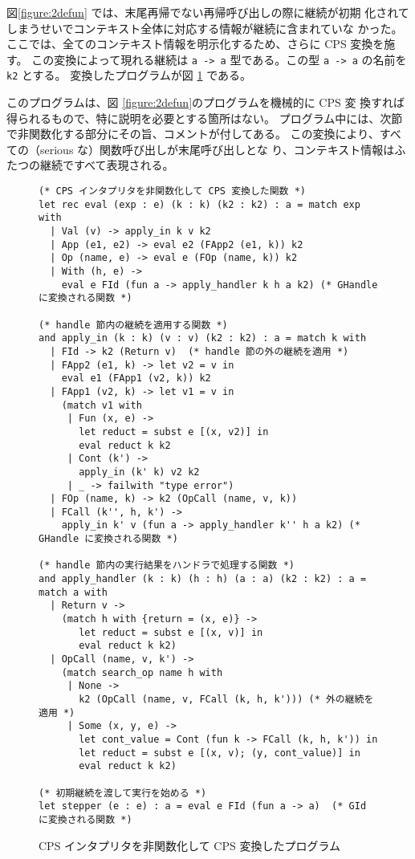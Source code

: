 図\ref{figure:2defun} では、末尾再帰でない再帰呼び出しの際に継続が初期
化されてしまうせいでコンテキスト全体に対応する情報が継続に含まれていな
かった。
ここでは、全てのコンテキスト情報を明示化するため、さらに CPS 変換を施
す。
この変換によって現れる継続は \texttt{a -> a} 型である。この型
\texttt{a -> a} の名前を \texttt{k2} とする。
変換したプログラムが図 \ref{figure:3cps} である。

このプログラムは、図 \ref{figure:2defun}のプログラムを機械的に CPS 変
換すれば得られるもので、特に説明を必要とする箇所はない。
プログラム中には、次節で非関数化する部分にその旨、コメントが付してある。
この変換により、すべての（serious な）関数呼び出しが末尾呼び出しとな
り、コンテキスト情報はふたつの継続ですべて表現される。

\begin{figure}
\begin{verbatim}
(* CPS インタプリタを非関数化して CPS 変換した関数 *)
let rec eval (exp : e) (k : k) (k2 : k2) : a = match exp with
  | Val (v) -> apply_in k v k2
  | App (e1, e2) -> eval e2 (FApp2 (e1, k)) k2
  | Op (name, e) -> eval e (FOp (name, k)) k2
  | With (h, e) ->
    eval e FId (fun a -> apply_handler k h a k2) (* GHandle に変換される関数 *)

(* handle 節内の継続を適用する関数 *)
and apply_in (k : k) (v : v) (k2 : k2) : a = match k with
  | FId -> k2 (Return v)  (* handle 節の外の継続を適用 *)
  | FApp2 (e1, k) -> let v2 = v in
    eval e1 (FApp1 (v2, k)) k2
  | FApp1 (v2, k) -> let v1 = v in
    (match v1 with
     | Fun (x, e) ->
       let reduct = subst e [(x, v2)] in
       eval reduct k k2
     | Cont (k') ->
       apply_in (k' k) v2 k2
     | _ -> failwith "type error")
  | FOp (name, k) -> k2 (OpCall (name, v, k))
  | FCall (k'', h, k') ->
    apply_in k' v (fun a -> apply_handler k'' h a k2) (* GHandle に変換される関数 *)

(* handle 節内の実行結果をハンドラで処理する関数 *)
and apply_handler (k : k) (h : h) (a : a) (k2 : k2) : a = match a with
  | Return v ->
    (match h with {return = (x, e)} ->
       let reduct = subst e [(x, v)] in
       eval reduct k k2)
  | OpCall (name, v, k') ->
    (match search_op name h with
     | None ->
       k2 (OpCall (name, v, FCall (k, h, k'))) (* 外の継続を適用 *)
     | Some (x, y, e) ->
       let cont_value = Cont (fun k -> FCall (k, h, k')) in
       let reduct = subst e [(x, v); (y, cont_value)] in
       eval reduct k k2)

(* 初期継続を渡して実行を始める *)
let stepper (e : e) : a = eval e FId (fun a -> a)  (* GId に変換される関数 *)
\end{verbatim}
\caption{CPS インタプリタを非関数化して CPS 変換したプログラム}
\label{figure:3cps}
\end{figure}

